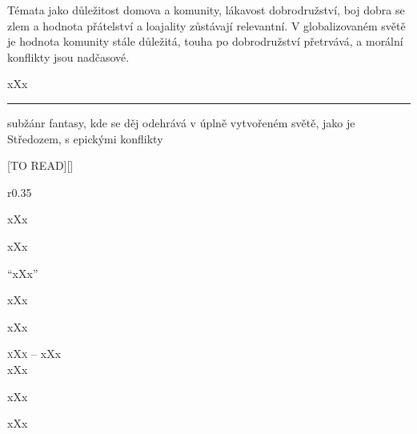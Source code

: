 \documentclass{extarticle} %
\begin{document}
\noindent Témata jako důležitost domova a komunity, lákavost dobrodružství,
boj dobra se zlem a hodnota přátelství a loajality zůstávají relevantní.
V globalizovaném světě je hodnota komunity stále důležitá, touha po dobrodružství přetrvává,
a morální konflikty jsou nadčasové.

\noindent 
xXx

\vfill

\noindent\begin{minipage}{\textwidth}
    {\textcolor{\wpagecolor}{\rule{\linewidth}{0.4pt}}
    \footnotesize
     subžánr fantasy, kde se děj odehrává v úplně vytvořeném světě,
    jako je Středozem, s epickými konflikty
    }
\end{minipage}

\newpage


\changefontsize{8pt}

[TO READ][\killpage]

\noindent\begin{wrapfigure}{r}{0.35\textwidth}
\tiny

\setlength{\parindent}{3pt}
xXx
\end{wrapfigure}


\noindent xXx



\noindent 
\enquote{xXx}

\noindent 
xXx

\noindent 
xXx

\noindent 
\textsc{xXx --} xXx \\

\noindent 
xXx

\noindent 
xXx

\noindent 
xXx



\end{document}
